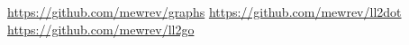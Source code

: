 \documentclass[a2paper,landscape,fontscale=0.35]{baposter}
\begin{document}
\begin{poster}
{
	\url{https://github.com/mewrev/graphs}
	\url{https://github.com/mewrev/ll2dot}
	\url{https://github.com/mewrev/ll2go}
}

{
	\renewcommand{\section}[2]{}
	
}

\end{poster}
\end{document}
